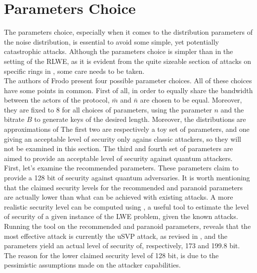 \section{Parameters Choice}
The parameters choice, especially when it comes to the distribution parameters of the noise distribution, is essential to avoid some simple, yet potentially catastrophic attacks. Although the parameters choice is simpler than in the setting of the RLWE, as it is evident from the quite sizeable section of attacks on specific rings in \cite{RLWE_attacks}, some care needs to be taken.\\
The authors of Frodo present four possible parameter choices. All of these choices have some points in common. First of all, in order to equally share the bandwidth between the actors of the protocol, $\bar{m}$ and $\bar{n}$ are chosen to be equal. Moreover, they are fixed to $8$ for all choices of parameters, using the parameter $n$ and the bitrate $B$ to generate keys of the desired length. Moreover, the distributions are approximations of 
The first two are respectively a toy set of parameters, and one giving an acceptable level of security only agains classic attackers, so they will not be examined in this section. The third and fourth set of parameters are aimed to provide an acceptable level of security against quantum attackers.\\
First, let's examine the recommended parameters. These parameters claim to provide a 128 bit of security against quantum adversaries. 
It is worth mentioning that the claimed security levels for the recommended and paranoid parameters are actually lower than what can be achieved with existing attacks. A more realistic security level can be computed using \cite{parameters}, a useful tool to estimate the level of security of a given instance of the LWE problem, given the known attacks. Running the tool on the recommended and paranoid parameters, reveals that the most effective attack is currently the uSVP attack, as revised in \cite{RUSVP}, and the parameters yield an actual level of security of, respectively, 173 and 199.8 bit. The reason for the lower claimed security level of 128 bit, is due to the pessimistic assumptions made on the attacker capabilities.

